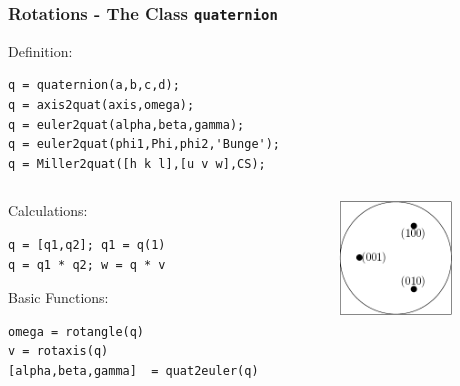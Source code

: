 \begin{frame}[fragile]
  \frametitle{Rotations - The \MTEX Class \texttt{\bf quaternion}}

Definition:

\begin{lstlisting}
q = quaternion(a,b,c,d);
q = axis2quat(axis,omega);
q = euler2quat(alpha,beta,gamma);
q = euler2quat(phi1,Phi,phi2,'Bunge');
q = Miller2quat([h k l],[u v w],CS);
\end{lstlisting}

\medskip

\begin{columns}
  \begin{column}{8.5cm}

    Calculations:

\begin{lstlisting}
q = [q1,q2]; q1 = q(1)
q = q1 * q2; w = q * v
\end{lstlisting}

    \medskip

    Basic Functions:

\begin{lstlisting}
omega = rotangle(q)
v = rotaxis(q)
[alpha,beta,gamma]  = quat2euler(q)
\end{lstlisting}

  \end{column}

  \begin{column}{3cm}
    \includegraphics[width=3cm]{pic/quaternion}
  \end{column}

\end{columns}
\end{frame}

